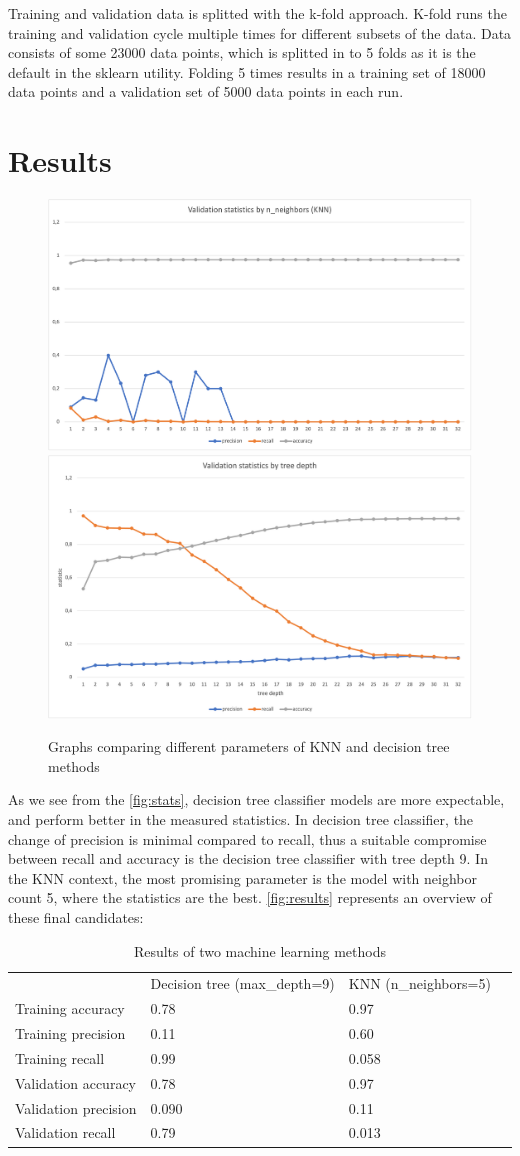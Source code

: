 \documentclass[12pt, a4paper]{article}
\begin{document}
    Training and validation data is splitted with the k-fold approach. K-fold runs the training and validation cycle multiple times for different
    subsets of the data. Data consists of some 23000 data points, which is splitted in to 5 folds as it is the default in the sklearn utility. 
    Folding 5 times results in a training set of 18000 data points and a validation set of 5000 data points in each run.
    
    \section{Results}
    \begin{figure}
      \caption{Graphs comparing different parameters of KNN and decision tree methods}\label{fig:stats}
      \centering
      \includegraphics[width=0.49\columnwidth]{val_stats_n.png}
      \includegraphics[width=0.49\columnwidth]{val_stats_dtc.png}
    \end{figure}
    As we see from the \autoref{fig:stats}, decision tree classifier models are more expectable, and perform better in the measured statistics.
    In decision tree classifier, the change of precision is minimal compared to recall, thus a suitable compromise between recall and accuracy is the decision
    tree classifier with tree depth 9. In the KNN context, the most promising parameter is the model with neighbor count 5, where the statistics are the best.
    \autoref{fig:results} represents an overview of these final candidates:
    \begin{table}[]
      \caption{Results of two machine learning methods}\label{fig:results}
      \centering
      \begin{tabular}{llll}
                           & Decision tree (max\_depth=9) & KNN (n\_neighbors=5) &  \\
      Training accuracy    & 0.78           & 0.97   &  \\
      Training precision   & 0.11           & 0.60   &  \\
      Training recall      & 0.99           & 0.058  &  \\
      Validation accuracy  & 0.78           & 0.97   &  \\
      Validation precision & 0.090          & 0.11  &  \\
      Validation recall    & 0.79           & 0.013 & 
      \end{tabular}
      \end{table}
\end{document}
